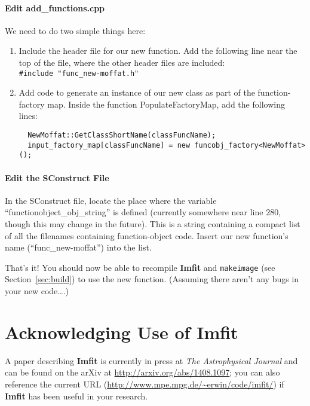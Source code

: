 \documentclass[10pt,a4paper,article]{memoir}
\newcommand{\imfit}{\textbf{Imfit}}
\newcommand{\Imfit}{\textbf{Imfit}}
\newcommand{\makeimage}{\texttt{makeimage}}
\begin{document}
\subsubsection{Edit add\_functions.cpp}

We need to do two simple things here:
\begin{enumerate}
\item Include the header file for our new function. Add the following line near
the top of the file, where the other header files are included:\\
\texttt{\#include "func\_new-moffat.h"}

\item Add code to generate an instance of our new class as part of the
function-factory map. Inside the function PopulateFactoryMap, add the following lines:
\begin{verbatim}
  NewMoffat::GetClassShortName(classFuncName);
  input_factory_map[classFuncName] = new funcobj_factory<NewMoffat>();
\end{verbatim}

\end{enumerate}



\subsubsection{Edit the SConstruct File}

In the SConstruct file, locate the place where the variable
``functionobject\_obj\_string'' is defined (currently somewhere near line 280,
though this may change in the future). This is a string containing a
compact list of all the filenames containing function-object code. Insert our
new function's name (``func\_new-moffat'') into the list.

\bigskip

That's it! You should now be able to recompile \imfit{} and \makeimage{} 
(see Section~\ref{sec:build}) to use
the new function. (Assuming there aren't any bugs in your new code\ldots.)



\chapter{Acknowledging Use of \Imfit}

A paper describing \imfit{} is currently in press at \textit{The Astrophysical Journal}
and can be found on the arXiv at \url{http://arxiv.org/abs/1408.1097}; you can also
reference the current URL (\url{http://www.mpe.mpg.de/~erwin/code/imfit/}) if \imfit{} has
been useful in your research.
\end{document}

